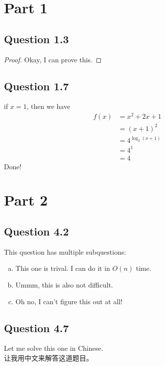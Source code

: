 \documentclass[12pt,letterpaper]{article}
\begin{document}
    \section*{Part 1}
        \subsection*{Question 1.3}
            \begin{proof}
                Okay, I can prove this.
            \end{proof}
        \subsection*{Question 1.7}
            if $x = 1$, then we have
            \begin{align*}
                f(x) & = x^2 + 2x + 1\\
                      & = (x + 1)^2\\
                      & = 4^{\log_2{(x + 1)}}\\
                      & = 4^1\\
                      & = 4
            \end{align*}
            Done!
    \newpage
    \section*{Part 2}
        \subsection*{Question 4.2}
            This question has multiple subquestions:
            \begin{enumerate}[a.]
                \item This one is trival. I can do it in $O(n)$ time.
                \item Ummm, this is also not difficult.
                \item Oh no, I can't figure this out at all!
            \end{enumerate}
        \subsection*{Question 4.7}
            Let me solve this one in Chinese. \\
            让我用中文来解答这道题目。
\end{document}
